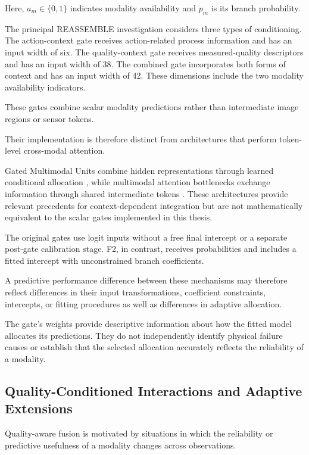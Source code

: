Here, \(a_m\in\{0,1\}\) indicates modality availability and \(p_m\) is its branch probability.

The principal REASSEMBLE investigation considers three types of conditioning. The action-context gate receives action-related process information and has an input width of six. The quality-context gate receives measured-quality descriptors and has an input width of 38. The combined gate incorporates both forms of context and has an input width of 42. These dimensions include the two modality availability indicators.

These gates combine scalar modality predictions rather than intermediate image regions or sensor tokens.

Their implementation is therefore distinct from architectures that perform token-level cross-modal attention.

Gated Multimodal Units combine hidden representations through learned conditional allocation \parencite{P006}, while multimodal attention bottlenecks exchange information through shared intermediate tokens \parencite{Nagrani2021MBT}. These architectures provide relevant precedents for context-dependent integration but are not mathematically equivalent to the scalar gates implemented in this thesis.

The original gates use logit inputs without a free final intercept or a separate post-gate calibration stage. F2, in contrast, receives probabilities and includes a fitted intercept with unconstrained branch coefficients.

A predictive performance difference between these mechanisms may therefore reflect differences in their input transformations, coefficient constraints, intercepts, or fitting procedures as well as differences in adaptive allocation.

The gate’s weights provide descriptive information about how the fitted model allocates its predictions. They do not independently identify physical failure causes or establish that the selected allocation accurately reflects the reliability of a modality.

\subsection{Quality-Conditioned Interactions and Adaptive Extensions}

Quality-aware fusion is motivated by situations in which the reliability or predictive usefulness of a modality changes across observations.

